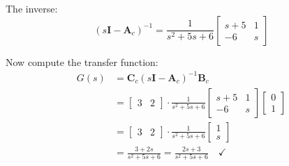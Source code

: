 \begin{example}
The inverse:
\begin{equation}
(s\mathbf{I} - \mathbf{A}_c)^{-1} = \frac{1}{s^2 + 5s + 6}\begin{bmatrix} s+5 & 1 \\ -6 & s \end{bmatrix}
\end{equation}

Now compute the transfer function:
\begin{align}
G(s) &= \mathbf{C}_c(s\mathbf{I} - \mathbf{A}_c)^{-1}\mathbf{B}_c \\
&= \begin{bmatrix} 3 & 2 \end{bmatrix} \cdot \frac{1}{s^2 + 5s + 6}\begin{bmatrix} s+5 & 1 \\ -6 & s \end{bmatrix} \begin{bmatrix} 0 \\ 1 \end{bmatrix} \\
&= \begin{bmatrix} 3 & 2 \end{bmatrix} \cdot \frac{1}{s^2 + 5s + 6}\begin{bmatrix} 1 \\ s \end{bmatrix} \\
&= \frac{3 + 2s}{s^2 + 5s + 6} = \frac{2s + 3}{s^2 + 5s + 6} \quad \checkmark
\end{align}
\end{example}

